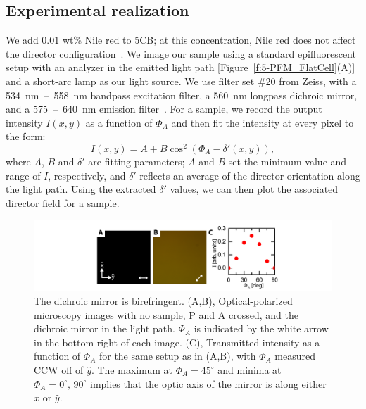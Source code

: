 \subsection{Experimental realization}
We add $0.01$ wt\% Nile red to 5CB; at this concentration, Nile red does not affect the director configuration~\cite{RN173}.
We image our sample using a standard epifluorescent setup with an analyzer in the emitted light path [Figure~\ref{f:5-PFM_FlatCell}(A)] and a short-arc lamp as our light source.
We use filter set \#20 from Zeiss, with a 534~nm~--~558~nm bandpass excitation filter, a 560~nm longpass dichroic mirror, and a 575~--~640~nm emission filter~\cite{RN288}.
For a sample, we record the output intensity $I(x,y)$ as a function of $\Phi_A$ and then fit the intensity at every pixel to the form:
\begin{equation}
    I(x,y) = A + B \cos^2{(\Phi_A-\delta'(x,y))},\label{e:5-IntFit}
\end{equation}
where $A$, $B$ and $\delta'$ are fitting parameters; $A$ and $B$ set the minimum value and range of $I$, respectively, and $\delta'$ reflects an average of the director orientation along the light path.
Using the extracted $\delta'$ values, we can then plot the associated director field for a sample.
\begin{figure}
  \centering
  \includegraphics{figures/C5/Ch5-Figs_DichroicMirror.png}
  \caption{The dichroic mirror is birefringent.
  (A,B), Optical-polarized microscopy images with no sample, P and A crossed, and the dichroic mirror in the light path.
  $\Phi_A$ is indicated by the white arrow in the bottom-right of each image.
  (C), Transmitted intensity as a function of $\Phi_A$ for the same setup as in (A,B), with $\Phi_A$ measured CCW off of $\hat{y}$.
  The maximum at $\Phi_A = 45^{\circ}$ and minima at $\Phi_A = 0^{\circ},\, 90^{\circ}$ implies that the optic axis of the mirror is along either $\hat{x}$ or $\hat{y}$.}\label{f:5-DichroicMirror}
\end{figure}


